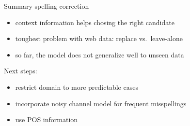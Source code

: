 \begin{frame}{Summary spelling correction}

  \begin{itemize}
  \item context information helps chosing the right candidate
  \item toughest problem with web data: replace vs.\ leave-alone
  \item so far, the model does not generalize well to unseen data
  \end{itemize}

\pause

Next steps:

\begin{itemize}
\item restrict domain to more predictable cases
\item incorporate noisy channel model for frequent misspellings
\item use POS information
\end{itemize}


  
\end{frame}

